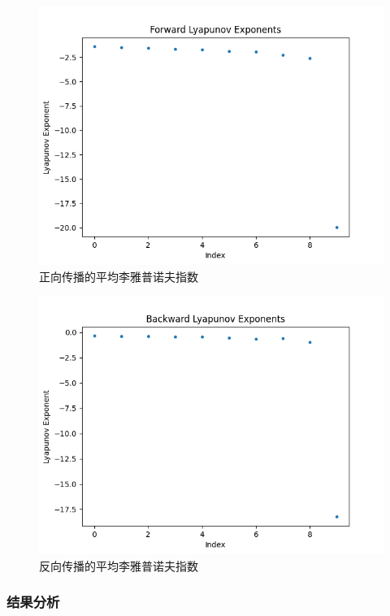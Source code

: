 \begin{figure}[htbp]
  \centering
  \includegraphics[width=1\textwidth]{figures/forward_lyapunov_avg.png}
  \caption{正向传播的平均李雅普诺夫指数}
  \label{fig:nn_lyapunov_exponents}
\end{figure}

\begin{figure}[htbp]
  \centering
  \includegraphics[width=1\textwidth]{figures/backward_lyapunov_avg.png}
  \caption{反向传播的平均李雅普诺夫指数}
  \label{fig:nn_lyapunov_exponents}
\end{figure}

\subsubsection{结果分析}

